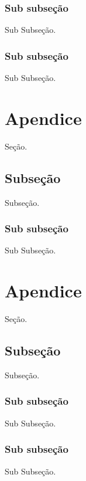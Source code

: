 \documentclass[11pt,a4paper]{article}
\begin{document}
\subsubsection{Sub subseção}
Sub Subseção.

\subsubsection{Sub subseção}
Sub Subseção.








\appendix %
\newpage
\section{Apendice}
Seção.

\subsection{Subseção}
Subseção.

\subsubsection{Sub subseção}
Sub Subseção.


\section{Apendice}
Seção.

\subsection{Subseção}
Subseção.

\subsubsection{Sub subseção}
Sub Subseção.

\subsubsection{Sub subseção}
Sub Subseção.


\end{document}

